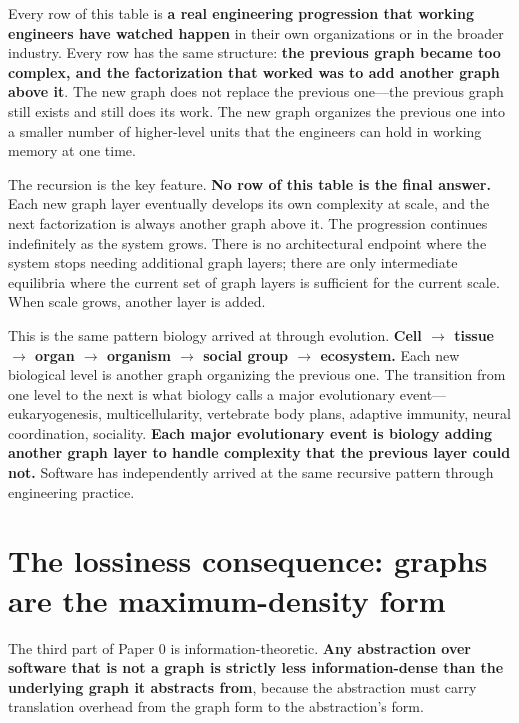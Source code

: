 \documentclass[11pt]{article}
\begin{document}
Every row of this table is \textbf{a real engineering progression that working engineers have watched happen} in their own organizations or in the broader industry. Every row has the same structure: \textbf{the previous graph became too complex, and the factorization that worked was to add another graph above it}. The new graph does not replace the previous one---the previous graph still exists and still does its work. The new graph organizes the previous one into a smaller number of higher-level units that the engineers can hold in working memory at one time.

The recursion is the key feature. \textbf{No row of this table is the final answer.} Each new graph layer eventually develops its own complexity at scale, and the next factorization is always another graph above it. The progression continues indefinitely as the system grows. There is no architectural endpoint where the system stops needing additional graph layers; there are only intermediate equilibria where the current set of graph layers is sufficient for the current scale. When scale grows, another layer is added.

This is the same pattern biology arrived at through evolution. \textbf{Cell $\to$ tissue $\to$ organ $\to$ organism $\to$ social group $\to$ ecosystem.} Each new biological level is another graph organizing the previous one. The transition from one level to the next is what biology calls a major evolutionary event---eukaryogenesis, multicellularity, vertebrate body plans, adaptive immunity, neural coordination, sociality. \textbf{Each major evolutionary event is biology adding another graph layer to handle complexity that the previous layer could not.} Software has independently arrived at the same recursive pattern through engineering practice.

\section{The lossiness consequence: graphs are the maximum-density form}
\label{sec:lossiness}

The third part of Paper 0 is information-theoretic. \textbf{Any abstraction over software that is not a graph is strictly less information-dense than the underlying graph it abstracts from}, because the abstraction must carry translation overhead from the graph form to the abstraction's form.
\end{document}
